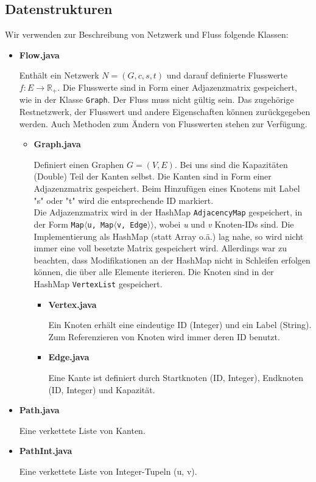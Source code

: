 \documentclass{llncs}
\begin{document}
\subsection{Datenstrukturen}
Wir verwenden zur Beschreibung von Netzwerk und Fluss folgende Klassen:
\begin{itemize}

\item \textbf{Flow.java}

Enthält ein Netzwerk $N=(G,c,s,t)$ und darauf definierte Flusswerte $f:E \rightarrow \mathbb{R_+}$. Die Flusswerte sind in Form einer Adjazenzmatrix gespeichert, wie in der Klasse \texttt{Graph}. Der Fluss muss nicht gültig sein. Das zugehörige Restnetzwerk, der Flusswert und andere Eigenschaften können zurückgegeben werden. Auch Methoden zum Ändern von Flusswerten stehen zur Verfügung.

\begin{itemize}
\item  \textbf{Graph.java}

Definiert einen Graphen $G=(V,E)$. Bei uns sind die Kapazitäten (Double) Teil der Kanten selbst. Die Kanten sind in Form einer Adjazenzmatrix gespeichert. Beim Hinzufügen eines Knotens mit Label "s" oder "t" wird die entsprechende ID markiert. \\
Die Adjazenzmatrix wird in der HashMap \texttt{AdjacencyMap} gespeichert, in der Form \texttt{Map$\langle$u, Map$\langle$v, Edge$\rangle\rangle$}, wobei \textit{u} und \textit{v} Knoten-IDs sind. Die Implementierung als HashMap (statt Array o.ä.) lag nahe, so wird nicht immer eine voll besetzte Matrix gespeichert wird. Allerdings war zu beachten, dass Modifikationen an der HashMap nicht in Schleifen erfolgen können, die über alle Elemente iterieren. Die Knoten sind in der HashMap \texttt{VertexList} gespeichert.

\begin{itemize}
\item  \textbf{Vertex.java}

Ein Knoten erhält eine eindeutige ID (Integer) und ein Label (String). Zum Referenzieren von Knoten wird immer deren ID benutzt.

\item  \textbf{Edge.java}

Eine Kante ist definiert durch Startknoten (ID, Integer), Endknoten (ID, Integer) und Kapazität. 

\end{itemize}
\end{itemize}
\item  \textbf{Path.java}

Eine verkettete Liste von Kanten.
\item  \textbf{PathInt.java}

Eine verkettete Liste von Integer-Tupeln (u, v).
\end{itemize}
\end{document}
